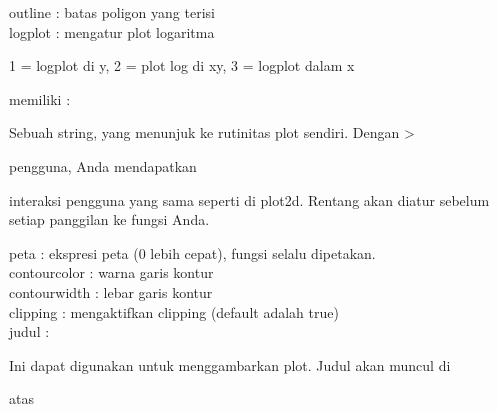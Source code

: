\documentclass{article}
\begin{document}
\begin{eulernotebook}
\begin{eulercomment}
\begin{eulercomment}
\begin{eulercomment}
\begin{eulercomment}
\begin{eulercomment}
\begin{eulercomment}
\begin{eulercomment}
\begin{eulercomment}
\begin{eulercomment}
\begin{eulercomment}
\begin{eulercomment}
\begin{eulercomment}
\begin{eulercomment}
\begin{eulercomment}
\begin{eulercomment}
\begin{eulercomment}
\begin{eulercomment}
\begin{eulercomment}
\begin{eulercomment}
\begin{eulercomment}
\begin{eulercomment}
\begin{eulercomment}
\begin{eulercomment}
\begin{eulercomment}
\begin{eulercomment}
\begin{eulercomment}
\begin{eulercomment}
\begin{eulercomment}
\begin{eulercomment}
outline      : batas poligon yang terisi\\
logplot      : mengatur plot logaritma\\
\end{eulercomment}
\begin{eulerttcomment}
            1 = logplot di y,
            2 = plot log di xy,
            3 = logplot dalam x
\end{eulerttcomment}
\begin{eulercomment}
memiliki     :\\
\end{eulercomment}
\begin{eulerttcomment}
  Sebuah string, yang menunjuk ke rutinitas plot sendiri. Dengan >
\end{eulerttcomment}
\begin{eulercomment}
pengguna, Anda mendapatkan\\
\end{eulercomment}
\begin{eulerttcomment}
  interaksi pengguna yang sama seperti di plot2d. Rentang akan diatur
  sebelum setiap panggilan ke fungsi Anda.
\end{eulerttcomment}
\begin{eulercomment}
peta         : ekspresi peta (0 lebih cepat), fungsi selalu dipetakan.\\
contourcolor : warna garis kontur\\
contourwidth : lebar garis kontur\\
clipping     : mengaktifkan clipping (default adalah true)\\
judul        :\\
\end{eulercomment}
\begin{eulerttcomment}
  Ini dapat digunakan untuk menggambarkan plot. Judul akan muncul di
\end{eulerttcomment}
\begin{eulercomment}
atas\\
\end{eulercomment}

\end{eulercomment}
\end{eulercomment}
\end{eulercomment}
\end{eulercomment}
\end{eulercomment}
\end{eulercomment}
\end{eulercomment}
\end{eulercomment}
\end{eulercomment}
\end{eulercomment}
\end{eulercomment}
\end{eulercomment}
\end{eulercomment}
\end{eulercomment}
\end{eulercomment}
\end{eulercomment}
\end{eulercomment}
\end{eulercomment}
\end{eulercomment}
\end{eulercomment}
\end{eulercomment}
\end{eulercomment}
\end{eulercomment}
\end{eulercomment}
\end{eulercomment}
\end{eulercomment}
\end{eulercomment}
\end{eulercomment}
\end{eulernotebook}
\end{document}
